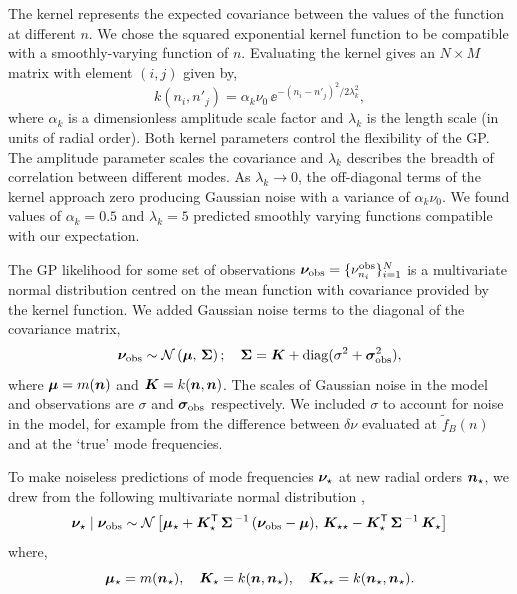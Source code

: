 The kernel represents the expected covariance between the values of the function at different \(n\). We chose the squared exponential kernel function to be compatible with a smoothly-varying function of \(n\). Evaluating the kernel gives an \(N \times M\) matrix with element \((i,j)\) given by,
%
\begin{equation}
    k(n_i, n'_j) = \alpha_k \nu_0 \, \ee^{- (n_i - n'_j)^2 / 2\lambda_k^2},
\end{equation}
%
where \(\alpha_k\) is a dimensionless amplitude scale factor and \(\lambda_k\) is the length scale (in units of radial order). Both kernel parameters control the flexibility of the GP. The amplitude parameter scales the covariance and \(\lambda_k\) describes the breadth of correlation between different modes. As \(\lambda_k \rightarrow 0\), the off-diagonal terms of the kernel approach zero producing Gaussian noise with a variance of \(\alpha_k\nu_0\). We found values of \(\alpha_k = 0.5\) and \(\lambda_k = 5\) predicted smoothly varying functions compatible with our expectation.

The GP likelihood for some set of observations \(\bm{\nu}_{{\mathrm{obs}}} = \{\nu_{n_i}^{{\mathrm{obs}}}\}_{i=1}^N\) is a multivariate normal distribution centred on the mean function with covariance provided by the kernel function. We added Gaussian noise terms to the diagonal of the covariance matrix,
%
\begin{equation}
    \bm{\nu}_{{\mathrm{obs}}} \sim \mathcal{N}\left( \bm{\mu}, \,  \bm{\Sigma} \right); \quad \bm{\Sigma} = \bm{K} + \mathrm{diag}(\sigma^2 + \bm{\sigma}_{{\mathrm{obs}}}^2), \label{eq:gp-like}
\end{equation}
%
where \(\bm{\mu} = m(\bm{n})\) and \(\bm{K} = k(\bm{n}, \bm{n})\). The scales of Gaussian noise in the model and observations are \(\sigma\) and \(\bm{\sigma}_{{\mathrm{obs}}}\) respectively. We included \(\sigma\) to account for noise in the model, for example from the difference between \(\delta\nu\) evaluated at \(\tilde{f}_B(n)\) and at the `true' mode frequencies.

To make noiseless predictions of mode frequencies \(\bm{\nu}_\star\) at new radial orders \(\bm{n}_\star\), we drew from the following multivariate normal distribution \citep{Rasmussen.Williams2006},
%
\begin{equation}
    \bm{\nu}_\star \mid \bm{\nu}_{{\mathrm{obs}}} \sim \mathcal{N} \left[ \bm{\mu}_\star + \bm{K}_\star^\mathsf{T} \, \bm{\Sigma}^{\,-1} \, (\bm{\nu}_{{\mathrm{obs}}} - \bm{\mu}), \, \bm{K}_{\star\star} - \bm{K}_\star^\mathsf{T} \, \bm{\Sigma}^{\,-1} \, \bm{K}_\star \right]
\end{equation}
%
where,
%
\begin{equation*}
    \bm{\mu}_\star = m(\bm{n}_\star), \quad \bm{K}_\star = k(\bm{n}, \bm{n}_\star), \quad \bm{K}_{\star\star} = k(\bm{n}_\star, \bm{n}_\star).
\end{equation*}
%

